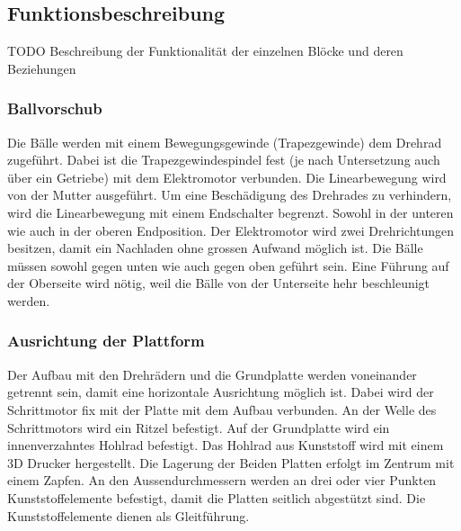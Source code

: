 \subsection{Funktionsbeschreibung}
TODO Beschreibung der Funktionalität der einzelnen Blöcke und deren Beziehungen 
\subsubsection{Ballvorschub}
Die Bälle werden mit einem Bewegungsgewinde (Trapezgewinde) dem Drehrad zugeführt. Dabei ist die Trapezgewindespindel fest (je nach Untersetzung auch über ein Getriebe) mit dem Elektromotor verbunden. Die Linearbewegung wird von der Mutter ausgeführt. Um eine Beschädigung des Drehrades zu verhindern, wird die Linearbewegung mit einem Endschalter begrenzt. Sowohl in der unteren wie auch in der oberen Endposition. Der Elektromotor wird zwei Drehrichtungen besitzen, damit ein Nachladen ohne grossen Aufwand möglich ist. Die Bälle müssen sowohl gegen unten wie auch gegen oben geführt sein. Eine Führung auf der Oberseite wird nötig, weil die Bälle von der Unterseite hehr beschleunigt werden.
\subsubsection{Ausrichtung der Plattform}
Der Aufbau mit den Drehrädern und die Grundplatte werden voneinander getrennt sein, damit eine horizontale Ausrichtung möglich ist. Dabei wird der Schrittmotor fix mit der Platte mit dem Aufbau verbunden. An der Welle des Schrittmotors wird ein Ritzel befestigt. Auf der Grundplatte wird ein innenverzahntes Hohlrad befestigt. Das Hohlrad aus Kunststoff wird mit einem 3D Drucker hergestellt. Die Lagerung der Beiden Platten erfolgt im Zentrum mit einem Zapfen. An den Aussendurchmessern werden an drei oder vier Punkten Kunststoffelemente befestigt, damit die Platten seitlich abgestützt sind. Die Kunststoffelemente dienen als Gleitführung.

